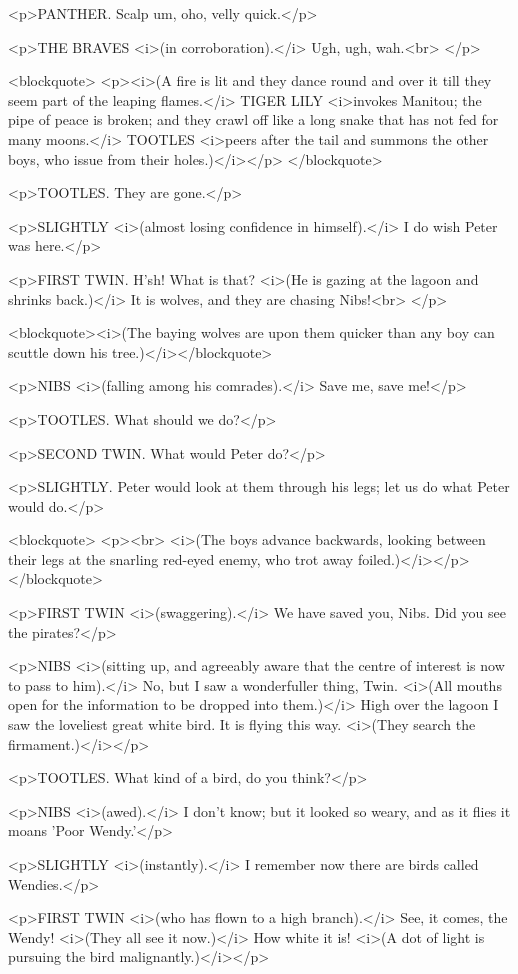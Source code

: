<p>PANTHER. Scalp um, oho, velly quick.</p>

<p>THE BRAVES <i>(in corroboration).</i> Ugh, ugh, wah.<br>
</p>

<blockquote>
<p><i>(A fire is lit and they dance round and over it till they seem
part of the leaping flames.</i> TIGER LILY <i>invokes Manitou; the
pipe of peace is broken; and they crawl off like a long snake that
has not fed for many moons.</i> TOOTLES <i>peers after the tail and
summons the other boys, who issue from their holes.)</i></p>
</blockquote>

<p>TOOTLES. They are gone.</p>

<p>SLIGHTLY <i>(almost losing confidence in himself).</i> I do wish
Peter was here.</p>

<p>FIRST TWIN. H'sh! What is that? <i>(He is gazing at the lagoon and
shrinks back.)</i> It is wolves, and they are chasing Nibs!<br>
</p>

<blockquote><i>(The baying wolves are upon them quicker than any boy
can scuttle down his tree.)</i></blockquote>

<p>NIBS <i>(falling among his comrades).</i> Save me, save me!</p>

<p>TOOTLES. What should we do?</p>

<p>SECOND TWIN. What would Peter do?</p>

<p>SLIGHTLY. Peter would look at them through his legs; let us do
what Peter would do.</p>

<blockquote>
<p><br>
 <i>(The boys advance backwards, looking between their legs at the
snarling red-eyed enemy, who trot away foiled.)</i></p>
</blockquote>

<p>FIRST TWIN <i>(swaggering).</i> We have saved you, Nibs. Did you
see the pirates?</p>

<p>NIBS <i>(sitting up, and agreeably aware that the centre of
interest is now to pass to him).</i> No, but I saw a wonderfuller
thing, Twin. <i>(All mouths open for the information to be dropped
into them.)</i> High over the lagoon I saw the loveliest great white
bird. It is flying this way. <i>(They search the firmament.)</i></p>

<p>TOOTLES. What kind of a bird, do you think?</p>

<p>NIBS <i>(awed).</i> I don't know; but it looked so weary, and as
it flies it moans 'Poor Wendy.'</p>

<p>SLIGHTLY <i>(instantly).</i> I remember now there are birds called
Wendies.</p>

<p>FIRST TWIN <i>(who has flown to a high branch).</i> See, it comes,
the Wendy! <i>(They all see it now.)</i> How white it is! <i>(A dot
of light is pursuing the bird malignantly.)</i></p>

